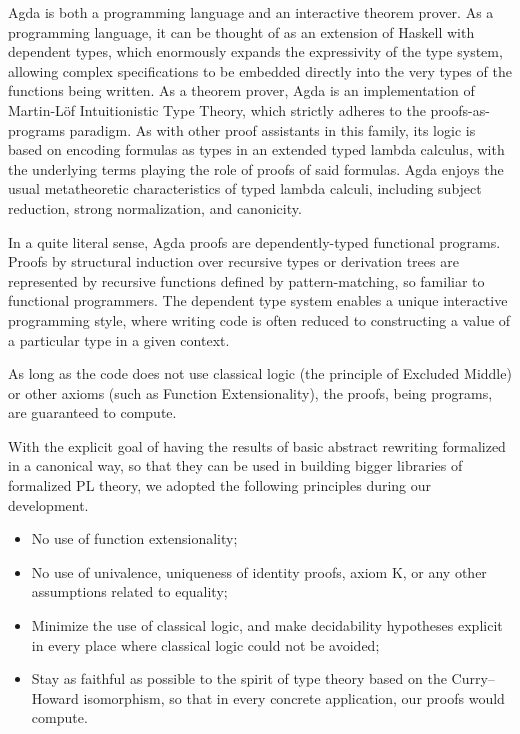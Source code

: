 Agda is both a programming language and an interactive theorem prover.
As a programming language, it can be thought of as an extension of Haskell
with dependent types, which enormously expands the expressivity of the type system,
allowing complex specifications to be embedded directly into the
very types of the functions being written.
As a theorem prover, Agda is an implementation of Martin-L\"of
Intuitionistic Type Theory, which strictly adheres to the proofs-as-programs paradigm.
As with other proof assistants in this family, its logic is based on encoding
formulas as types in an extended typed lambda calculus, with the underlying terms
playing the role of proofs of said formulas. Agda enjoys the usual metatheoretic characteristics
of typed lambda calculi, including subject reduction, strong normalization, and canonicity.

In a quite literal sense, Agda proofs are dependently-typed functional programs.
Proofs by structural induction over recursive types or derivation trees are represented by
recursive functions defined by pattern-matching, so familiar to functional programmers.
The dependent type system enables a unique interactive programming style, where
writing code is often reduced to constructing a value of a particular type in a given context.


As long as the code does not use classical logic (the principle of Excluded Middle) or
other axioms (such as Function Extensionality), the proofs, being programs,
are guaranteed to compute. %

With the explicit goal of having the results of basic abstract rewriting
formalized in a canonical way, so that they can be used in building bigger
libraries of formalized PL theory, we adopted the following
principles during our development.

\begin{itemize}
  \item No use of function extensionality;
  \item No use of univalence, uniqueness of identity proofs, axiom K, or any other
  assumptions related to equality;
  \item Minimize the use of classical logic, and make decidability hypotheses explicit in every place where classical logic could not be avoided;
  \item Stay as faithful as possible to the spirit of type theory based on the Curry--Howard isomorphism, so that in every concrete application, our proofs would compute.
\end{itemize}

